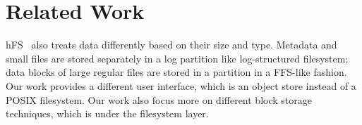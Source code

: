 \section{Related Work} 
\label{sec:related} 

hFS~\cite{eurosys_hfs} also treats data differently based on their size and
type. Metadata and small files are stored separately in a log partition like
log-structured filesystem; data blocks of large regular files are stored in a
partition in a FFS-like fashion. Our work provides a different user interface,
which is an object store instead of a POSIX filesystem. Our work also focus
more on different block storage techniques, which is under the filesystem
layer.







